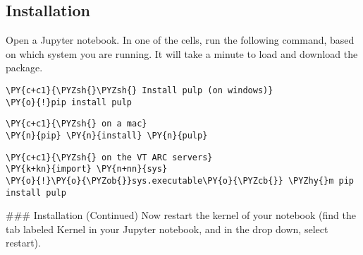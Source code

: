 


    \hypertarget{installation}{%
\subsection{Installation}\label{installation}}

Open a Jupyter notebook. In one of the cells, run the following command,
based on which system you are running. It will take a minute to load and
download the package.

    \begin{tcolorbox}[breakable, size=fbox, boxrule=1pt, pad at break*=1mm,colback=cellbackground, colframe=cellborder]
\begin{Verbatim}[commandchars=\\\{\}]
\PY{c+c1}{\PYZsh{}\PYZsh{} Install pulp (on windows)}
\PY{o}{!}pip install pulp
\end{Verbatim}
\end{tcolorbox}

    \begin{tcolorbox}[breakable, size=fbox, boxrule=1pt, pad at break*=1mm,colback=cellbackground, colframe=cellborder]
\begin{Verbatim}[commandchars=\\\{\}]
\PY{c+c1}{\PYZsh{} on a mac}
\PY{n}{pip} \PY{n}{install} \PY{n}{pulp}
\end{Verbatim}
\end{tcolorbox}

    \begin{tcolorbox}[breakable, size=fbox, boxrule=1pt, pad at break*=1mm,colback=cellbackground, colframe=cellborder]
\begin{Verbatim}[commandchars=\\\{\}]
\PY{c+c1}{\PYZsh{} on the VT ARC servers}
\PY{k+kn}{import} \PY{n+nn}{sys}
\PY{o}{!}\PY{o}{\PYZob{}}sys.executable\PY{o}{\PYZcb{}} \PYZhy{}m pip install pulp
\end{Verbatim}
\end{tcolorbox}

    \#\#\# Installation (Continued) Now restart the kernel of your notebook
(find the tab labeled Kernel in your Jupyter notebook, and in the drop
down, select restart).

